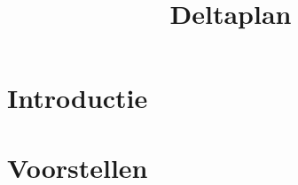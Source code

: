 \documentclass[DIV=calc]{scrbook}
\title{Deltaplan \\ \versionnumber}
\author{}
\begin{document}


\maketitle

\setcounter{page}{3}


\tableofcontents

\part{Introductie}
% 

% 
% 


\part{Voorstellen}


\end{document}
